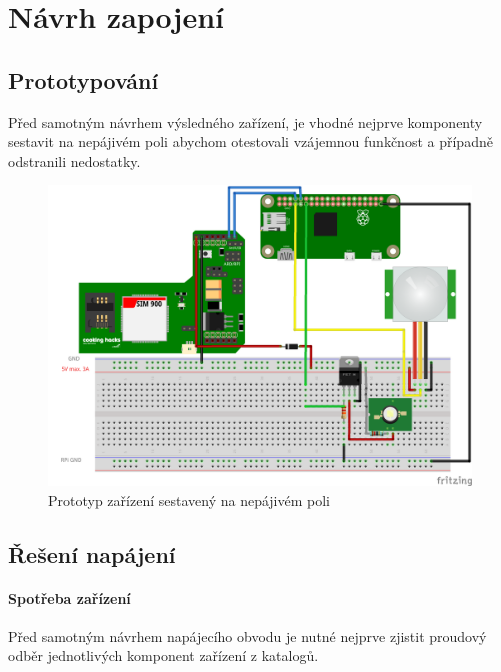 \chapter{Návrh zapojení}

\section{Prototypování}

Před samotným návrhem výsledného zařízení, je vhodné nejprve komponenty sestavit na nepájivém poli abychom otestovali vzájemnou funkčnost a případně odstranili nedostatky.

\begin{figure}[h]
  \begin{center}
    \includegraphics[scale=0.75]{obrazky/schema.png}
  \end{center}
  \caption{Prototyp zařízení sestavený na nepájivém poli}
\end{figure}

\section{Řešení napájení}
\subsubsection{Spotřeba zařízení}
Před samotným návrhem napájecího obvodu je nutné nejprve zjistit proudový odběr jednotlivých komponent zařízení z katalogů.

